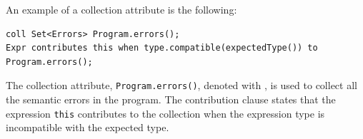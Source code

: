 \begin{itemize}
    An example of a collection attribute is the following:
    \begin{lstlisting}[language=JastAdd]
coll Set<Errors> Program.errors();
Expr contributes this when type.compatible(expectedType()) to Program.errors();
    \end{lstlisting}
    The collection attribute, \texttt{Program.errors()}, denoted with ,
    is used to collect all the semantic errors in the program. The contribution clause
    states that the expression \texttt{this} contributes to the collection when 
    the expression type is incompatible with the expected type.
\end{itemize}




